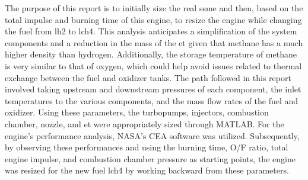 
The purpose of this report is to initially size the real \acrfull{ssme} and then, based on the total impulse and burning time of this engine, to resize the engine while changing the fuel from \acrlong{lh2} to \acrfull{lch4}. 
This analysis anticipates a simplification of the system components and a reduction in the mass of the \acrfull{et} given that methane has a much higher density than hydrogen. Additionally, the storage temperature of methane is very similar to that of oxygen, which could help avoid issues related to thermal exchange between the fuel and oxidizer tanks.
The path followed in this report involved taking upstream and downstream pressures of each component, the inlet temperatures to the various components, and the mass flow rates of the fuel and oxidizer. Using these parameters, the turbopumps, injectors, combustion chamber, nozzle, and \acrlong{et} were appropriately sized through MATLAB. For the engine's performance analysis, NASA's CEA software was utilized. Subsequently, by observing these performances and using the burning time, O/F ratio, total engine impulse, and combustion chamber pressure as starting points, the engine was resized for the new fuel \acrshort{lch4} by working backward from these parameters.

